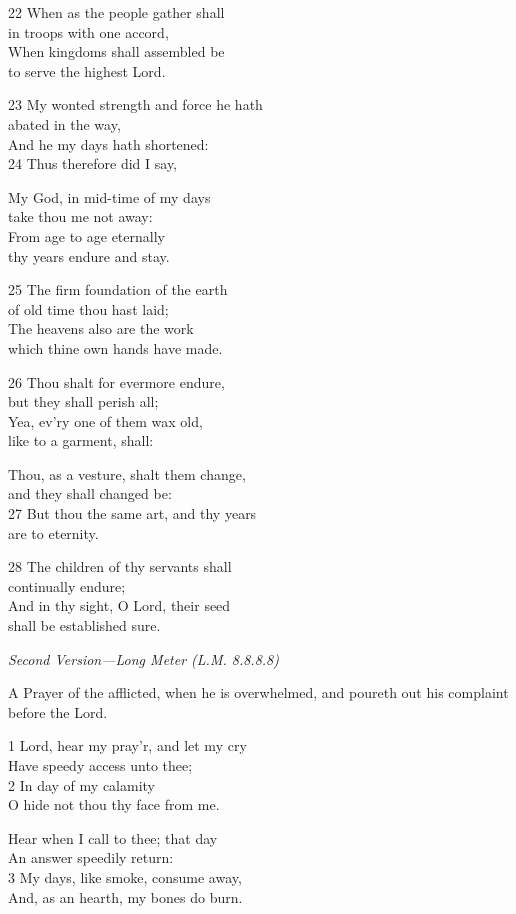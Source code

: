 22 When as the people gather shall\\
in troops with one accord,\\
When kingdoms shall assembled be\\
to serve the highest Lord.

23 My wonted strength and force he hath\\
abated in the way,\\
And he my days hath shortened:\\
24 Thus therefore did I say,

My God, in mid-time of my days\\
take thou me not away:\\
From age to age eternally\\
thy years endure and stay.

25 The firm foundation of the earth\\
of old time thou hast laid;\\
The heavens also are the work\\
which thine own hands have made.

26 Thou shalt for evermore endure,\\
but they shall perish all;\\
Yea, ev’ry one of them wax old,\\
like to a garment, shall:

Thou, as a vesture, shalt them change,\\
and they shall changed be:\\
27 But thou the same art, and thy years\\
are to eternity.

28 The children of thy servants shall\\
continually endure;\\
And in thy sight, O Lord, their seed\\
shall be established sure.

\emph{Second Version---Long Meter (L.M. 8.8.8.8)}

A Prayer of the afflicted, when he is overwhelmed,
and poureth out his complaint before the Lord.

1 Lord, hear my pray’r, and let my cry\\
Have speedy access unto thee;\\
2 In day of my calamity\\
O hide not thou thy face from me.

Hear when I call to thee; that day\\
An answer speedily return:\\
3 My days, like smoke, consume away,\\
And, as an hearth, my bones do burn.

